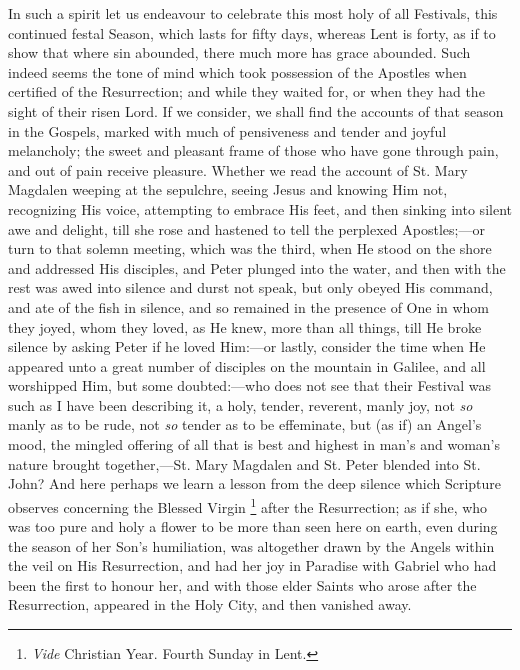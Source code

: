 In such a spirit let us endeavour to celebrate this most holy of
all Festivals, this continued festal Season, which lasts for fifty
days, whereas Lent is forty, as if to show that where sin abounded,
there much more has grace abounded. Such indeed seems the tone of mind
which took possession of the Apostles when certified of the
Resurrection; and while they waited for, or when they had the sight of
their risen Lord. If we consider, we shall find the accounts of that
season in the Gospels, marked with much of pensiveness and tender and
joyful melancholy; the sweet and pleasant frame of those who have gone
through pain, and out of pain receive pleasure. Whether we read the
account of St. Mary Magdalen weeping at the sepulchre, seeing Jesus
and knowing Him not, recognizing His voice, attempting to embrace His
feet, and then sinking into silent awe and delight, till she rose and
hastened to tell the perplexed Apostles;—or turn to that solemn
meeting, which was the third, when He stood on the shore and addressed
His disciples, and Peter plunged into the water, and then with the
rest was awed into silence and durst not speak, but only obeyed His
command, and ate of the fish in silence, and so remained in the
presence of One in whom they joyed, whom they loved, as He knew, more
than all things, till He broke silence by asking Peter if he loved
Him:—or lastly, consider the time when He appeared unto a great
number of disciples on the mountain in Galilee, and all worshipped
Him, but some doubted:—who does not see that their Festival was such
as I have been describing it, a holy, tender, reverent, manly joy, not
\emph{so} manly as to be rude, not \emph{so} tender as to be
effeminate, but (as if) an Angel's mood, the mingled offering of all
that is best and highest in man's and woman's nature brought
together,—St. Mary Magdalen and St. Peter blended into St. John? And
here perhaps we learn a lesson from the deep silence which Scripture
observes concerning the Blessed Virgin \footnote{\emph{Vide}
Christian Year. Fourth Sunday in Lent.} after the Resurrection; as if she, who was too pure and holy a
flower to be more than seen here on earth, even during the season of
her Son's humiliation, was altogether drawn by the Angels within the
veil on His Resurrection, and had her joy in Paradise with Gabriel who
had been the first to honour her, and with those elder Saints who
arose after the Resurrection, appeared in the Holy City, and then
vanished away.

